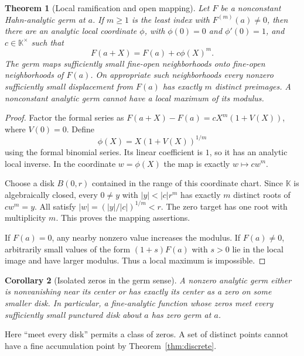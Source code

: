 \documentclass[11pt,a4paper]{article}
\numberwithin{equation}{section}
\newtheorem{theorem}{Theorem}[section]
\newtheorem{corollary}[theorem]{Corollary}
\theoremstyle{definition}
\theoremstyle{remark}
\newcommand{\K}{\mathbb K}
\begin{document}
\begin{theorem}[Local ramification and open mapping]
\label{thm:ramification}
Let $F$ be a nonconstant Hahn-analytic germ at $a$. If $m\geq1$ is the least index with $F^{(m)}(a)\ne0$, then there are an analytic local coordinate $\phi$, with $\phi(0)=0$ and $\phi'(0)=1$, and $c\in\K^\times$ such that
\[
 F(a+X)=F(a)+c\phi(X)^m.
\]
The germ maps sufficiently small fine-open neighborhoods onto fine-open neighborhoods of $F(a)$. On appropriate such neighborhoods every nonzero sufficiently small displacement from $F(a)$ has exactly $m$ distinct preimages. A nonconstant analytic germ cannot have a local maximum of its modulus.
\end{theorem}
\begin{proof}
Factor the formal series as
$F(a+X)-F(a)=cX^m(1+V(X))$, where $V(0)=0$. Define
\[
 \phi(X)=X(1+V(X))^{1/m}
\]
using the formal binomial series. Its linear coefficient is $1$, so it has an analytic local inverse. In the coordinate $w=\phi(X)$ the map is exactly $w\mapsto cw^m$.

Choose a disk $B(0,r)$ contained in the range of this coordinate chart. Since $\K$ is algebraically closed, every $0\ne y$ with $|y|<|c|r^m$ has exactly $m$ distinct roots of $cw^m=y$. All satisfy $|w|=(|y|/|c|)^{1/m}<r$. The zero target has one root with multiplicity $m$. This proves the mapping assertions.

If $F(a)=0$, any nearby nonzero value increases the modulus. If $F(a)\ne0$, arbitrarily small values of the form $(1+s)F(a)$ with $s>0$ lie in the local image and have larger modulus. Thus a local maximum is impossible.
\end{proof}

\begin{corollary}[Isolated zeros in the germ sense]
\label{cor:isolated}
A nonzero analytic germ either is nonvanishing near its center or has exactly its center as a zero on some smaller disk. In particular, a fine-analytic function whose zeros meet every sufficiently small punctured disk about $a$ has zero germ at $a$.
\end{corollary}
Here ``meet every disk'' permits a class of zeros. A set of distinct points cannot have a fine accumulation point by Theorem~\ref{thm:discrete}.
\end{document}

